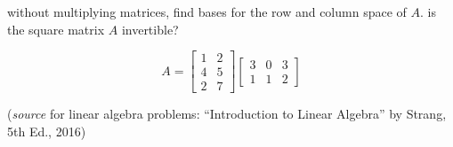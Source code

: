 \documentclass[addpoints]{exam}
\begin{document}
\begin{questions}
\question without multiplying matrices, find bases for the row and column space of $A$. is the square matrix $A$ invertible?

\begin{equation*}
      A = \begin{bmatrix} 1&2\\4&5 \\ 2&7 \end{bmatrix} \begin{bmatrix} 3&0&3\\1&1 &2 \end{bmatrix}
\end{equation*}


\end{questions}

 (\emph{source} for linear algebra problems: ``Introduction to Linear Algebra'' by Strang, 5th Ed., 2016)
\end{document}
